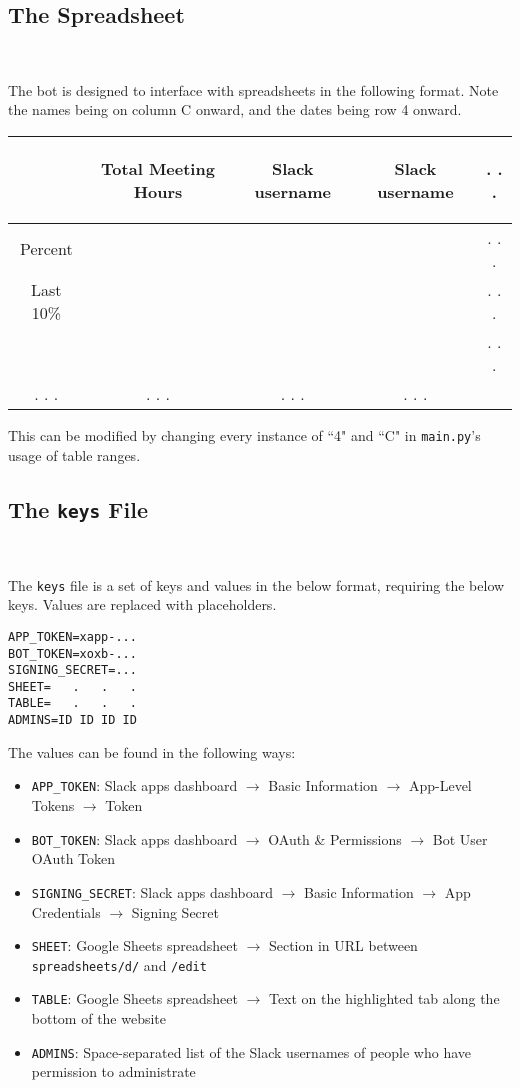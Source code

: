 \documentclass{article}
\begin{document}
\subsection{The Spreadsheet}

\

The bot is designed to interface with spreadsheets in the following format. Note the names being on column C onward, and the dates being row 4 onward.

\begin{center} \begin{tabular}{|c||c|c|c|c} \hline
	& \begin{turn}{90}Total Meeting Hours\end{turn} & \begin{turn}{90}Slack username\end{turn} & \begin{turn}{90}Slack username\end{turn} & . . . \\ \hline
	Percent & & & & . . .\\ \hline
	Last 10\% & & & & . . .\\ \hline \hline
	& & & & . . .\\ \hline
	. . .&. . .&. . .&. . .&
\end{tabular} \end{center}

This can be modified by changing every instance of ``4" and ``C" in \texttt{main.py}'s usage of table ranges.

\subsection{The \texttt{keys} File}

\

The \texttt{keys} file is a set of keys and values in the below format, requiring the below keys. Values are replaced with placeholders.
\begin{verbatim}
APP_TOKEN=xapp-...
BOT_TOKEN=xoxb-...
SIGNING_SECRET=...
SHEET=   .   .   .
TABLE=   .   .   .
ADMINS=ID ID ID ID
\end{verbatim}

The values can be found in the following ways:
\begin{itemize}
	\item \texttt{APP\_TOKEN}: Slack apps dashboard $\to$ Basic Information $\to$ App-Level Tokens $\to$ Token
	\item \texttt{BOT\_TOKEN}: Slack apps dashboard $\to$ OAuth \& Permissions $\to$ Bot User OAuth Token
	\item \texttt{SIGNING\_SECRET}: Slack apps dashboard $\to$ Basic Information $\to$ App Credentials $\to$ Signing Secret
	\item \texttt{SHEET}: Google Sheets spreadsheet $\to$ Section in URL between \texttt{spreadsheets/d/} and \texttt{/edit}
	\item \texttt{TABLE}: Google Sheets spreadsheet $\to$ Text on the highlighted tab along the bottom of the website
	\item \texttt{ADMINS}: Space-separated list of the Slack usernames of people who have permission to administrate
\end{itemize}
\end{document}
